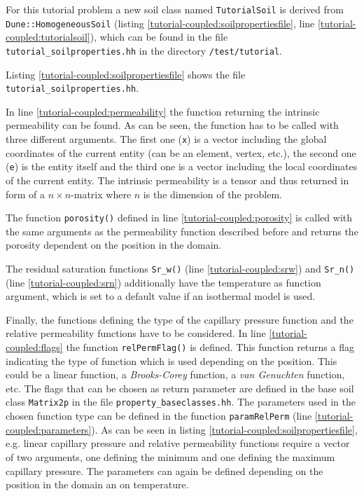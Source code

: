 For this tutorial problem a new soil class named \texttt{TutorialSoil} is derived from \texttt{Dune::HomogeneousSoil} (listing \ref{tutorial-coupled:soilpropertiesfile}, line \ref{tutorial-coupled:tutorialsoil}), which can be found in the file \texttt{tutorial\_soilproperties.hh} in the directory \texttt{/test/tutorial}.

Listing \ref{tutorial-coupled:soilpropertiesfile} shows the file \texttt{tutorial\_soilproperties.hh}.

\begin{lst}\label{tutorial-coupled:soilpropertiesfile} \mbox{}

\end{lst}

In line \ref{tutorial-coupled:permeability} the function returning the intrinsic permeability can be found. As can be seen, the function has to be called with three different arguments. The first one (\texttt{x}) is a vector including the global coordinates of the current entity (can be an element, vertex, etc.), the second one (\texttt{e}) is the entity itself and the third one is a vector including the local coordinates of the current entity. The intrinsic permeability is a tensor and thus returned in form of a $n \times n$-matrix where $n$ is the dimension of the problem.

The function \texttt{porosity()} defined in line \ref{tutorial-coupled:porosity} is called with the same arguments as the permeability function described before and returns the porosity dependent on the position in the domain.

The residual saturation functions \texttt{Sr\_w()} (line \ref{tutorial-coupled:srw}) and \texttt{Sr\_n()} (line \ref{tutorial-coupled:srn}) additionally have the temperature as function argument, which is set to a default value if an isothermal model is used.

Finally, the functions defining the type of the capillary pressure function and the relative permeability functions have to be considered. In line \ref{tutorial-coupled:flags} the function \texttt{relPermFlag()} is defined. This function returns a flag indicating the type of function which is used depending on the position. This could be a linear function, a \textit{Brooks-Corey} function, a \textit{van Genuchten} function, etc. The flags that can be chosen as return parameter are defined in the base soil class \texttt{Matrix2p} in the file \texttt{property\_baseclasses.hh}. The parameters used in the chosen function type can be defined in the function \texttt{paramRelPerm} (line \ref{tutorial-coupled:parameters}). As can be seen in listing \ref{tutorial-coupled:soilpropertiesfile}, e.g. linear capillary pressure and relative permeability functions require a vector of two arguments, one defining the minimum and one defining the maximum capillary pressure. The parameters can again be defined depending on the position in the domain an on temperature.


